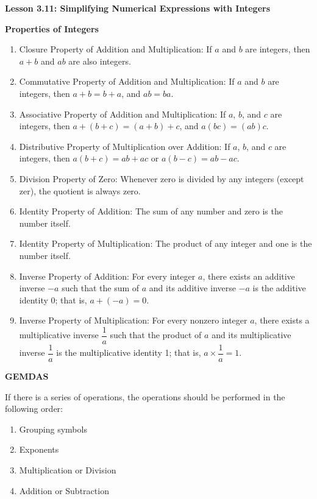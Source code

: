\begin{center}
\textbf{Lesson 3.11: Simplifying Numerical Expressions with Integers}
\end{center}

\vspace*{-1.5ex}

\noindent\textbf{Properties of Integers}
\begin{enumerate}[noitemsep, label = \color{blue}\arabic*. ]
\item Closure Property of Addition and Multiplication: If \(a\) and \(b\) are integers, then \(a + b\) and \(ab\) are also integers.
\item Commutative Property of Addition and Multiplication: If \(a\) and \(b\) are integers, then \(a + b = b + a\), and \(ab = ba\).
\item Associative Property of Addition and Multiplication:  If \(a\), \(b\), and \(c\) are integers, then \(a + (b + c) = (a + b) + c\), and \(a(bc) = (ab)c\).
\item Distributive Property of Multiplication over Addition:  If \(a\), \(b\), and \(c\) are integers, then \(a(b + c) = ab + ac\) or \(a(b - c) = ab - ac\).
\item Division Property of Zero: Whenever zero is divided by any integers (except zer), the quotient is always zero.
\item Identity Property of Addition: The sum of any number and zero is the number itself.
\item Identity Property of Multiplication: The product of any integer and one is the number itself.
\item Inverse Property of Addition: For every integer \(a\), there exists an additive inverse \(-a\) such that the sum of \(a\) and its additive inverse \(-a\) is the additive identity 0; that is, \(a + (-a) = 0\).
\item Inverse Property of Multiplication: For every nonzero integer \(a\), there exists a multiplicative inverse \(\dfrac{1}{a}\) such that the product of \(a\) and its multiplicative inverse \(\dfrac{1}{a}\) is the multiplicative identity 1; that is, \(a \times \dfrac{1}{a} = 1\).
\end{enumerate}

\noindent\textbf{GEMDAS}

If there is a series of operations, the operations should be performed in the following order:
\begin{multicols}{2}
\begin{enumerate}[noitemsep, label = \color{blue}\arabic*. ]
\item Grouping symbols %
\item Exponents
\item Multiplication or Division
\item Addition or Subtraction
\end{enumerate}
\end{multicols}
